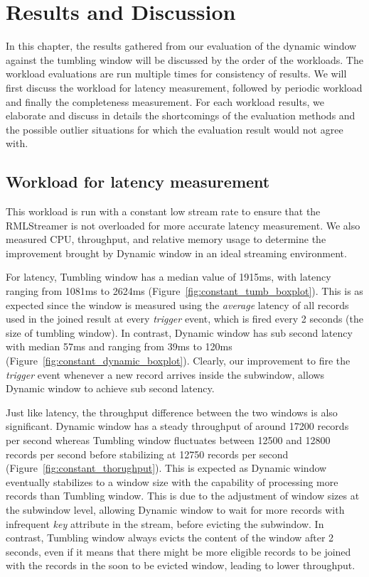 \chapter{Results and Discussion}%
\label{chap:Results and Discussion}

In this chapter, the results gathered from our evaluation of the dynamic window against 
the tumbling window will be discussed by the order of the workloads. The workload 
evaluations are run multiple times for consistency of results. We will first 
discuss the workload for latency measurement, followed by periodic workload and 
finally the completeness measurement. For each workload results, we elaborate 
and discuss in details the shortcomings of the evaluation methods and the 
possible outlier situations for which the evaluation result would not agree with.



\section{Workload for latency measurement}%
\label{sec:Results Workload for latency measurement}

This workload is run with a constant low stream rate to ensure that 
the RMLStreamer is not overloaded for more accurate latency measurement. We also measured 
CPU, throughput, and relative memory usage to determine the improvement brought by Dynamic window
in an ideal streaming environment.

For latency, Tumbling window has a median value of 1915ms, with latency ranging from 1081ms to 2624ms (Figure~\ref{fig:constant_tumb_boxplot}). 
This is as expected since the window is measured using the \emph{average} latency of all records used 
in the joined result at every \emph{trigger} event, which is fired every 2 seconds (the size of tumbling window).
In contrast, Dynamic window has sub second latency with median 57ms and ranging from 39ms to 120ms (Figure~\ref{fig:constant_dynamic_boxplot}). Clearly, 
our improvement to fire the \emph{trigger} event whenever a new record arrives inside the subwindow, allows 
Dynamic window to achieve sub second latency. 

Just like latency, the throughput difference between the two windows is also significant. Dynamic window has a 
steady throughput of around 17200 records per second whereas Tumbling window fluctuates between 
12500 and 12800 records per second before stabilizing at 12750 records per second (Figure~\ref{fig:constant_thorughput}). This is expected as Dynamic 
window eventually stabilizes to a window size with the capability of processing more records than Tumbling window. This is 
due to the adjustment of window sizes at the subwindow level, allowing Dynamic window to wait for more records 
with infrequent \emph{key} attribute in the stream, before evicting the subwindow. In contrast, Tumbling window 
always evicts the content of the window after 2 seconds, even if it means that there might be more 
eligible records to be joined with the records in the soon to be evicted window, leading to lower throughput.  

